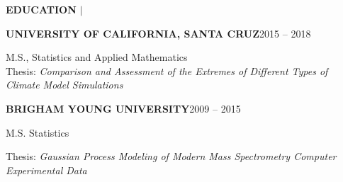 \documentclass[12pt]{article}
\newcommand{\entrypar}[5]{
    \textbf{\MakeUppercase{#1}}\hfill #3 -- #4

    \textbf{#2}

    #5
    }
\begin{document}
\begin{minipage}[t]{0.19\textwidth}
    \begin{flushright}
        \textbf{EDUCATION} $\vert$ \ \
    \end{flushright}
\end{minipage}%
%
\begin{minipage}[t]{0.81\textwidth}
    \begin{flushleft}
        \entrypar{University of California, Santa Cruz}{\vspace{-12pt}}{2015}{2018}{M.S., Statistics and Applied Mathematics} \\
        Thesis: \emph{Comparison and Assessment of the Extremes of Different Types of Climate Model Simulations}
        \bigskip

        \entrypar{Brigham Young University}{\vspace{-12pt}}{2009}{2015}{M.S. Statistics}

        Thesis: \emph{Gaussian Process Modeling of Modern Mass Spectrometry Computer Experimental Data}
    \end{flushleft}
\end{minipage}
\end{document}
